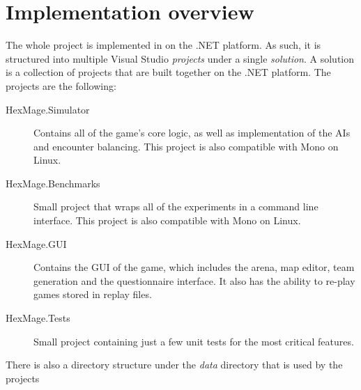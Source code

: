 \chapter{Implementation overview}
\label{implementation-overview}

The whole project is implemented in \Csh{} on the .NET platform. As such, it is structured
into multiple Visual Studio \emph{projects} under a single \emph{solution}. A solution is a collection
of projects that are built together on the .NET platform. The projects are
the following:


\begin{description}
	\item[HexMage.Simulator] Contains all of the game's core logic, as well as implementation of the AIs
		and encounter balancing. This project is also compatible with Mono on Linux.
	\item[HexMage.Benchmarks] Small project that wraps all of the experiments in a command line interface.
		This project is also compatible with Mono on Linux.
	\item[HexMage.GUI] Contains the GUI of the game, which includes the arena, map editor, team generation
		and the questionnaire interface. It also has the ability to re-play games stored in replay files.
	\item[HexMage.Tests] Small project containing just a few unit tests for the most critical features.
\end{description}

There is also a directory structure under the \emph{data} directory that is used by the projects

